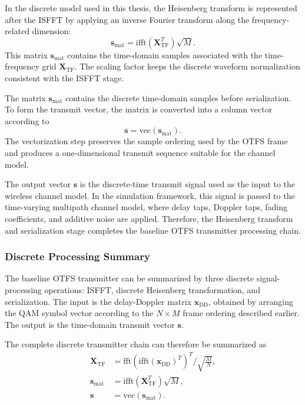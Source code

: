 In the discrete model used in this thesis, the Heisenberg transform is represented after the ISFFT by applying an inverse Fourier transform along the frequency-related dimension:
\begin{equation}
    \mathbf{s}_{\mathrm{mat}}
    =
    \mathrm{ifft}
    \left(
    \mathbf{X}_{\mathrm{TF}}^T
    \right)
    \sqrt{M}.
    \label{eq:heisenberg_matlab}
\end{equation}
This matrix \(\mathbf{s}_{\mathrm{mat}}\) contains the time-domain samples associated with the time-frequency grid \(\mathbf{X}_{\mathrm{TF}}\). The scaling factor keeps the discrete waveform normalization consistent with the ISFFT stage.

The matrix \(\mathbf{s}_{\mathrm{mat}}\) contains the discrete time-domain samples before serialization. To form the transmit vector, the matrix is converted into a column vector according to
\begin{equation}
    \mathbf{s}
    =
    \mathrm{vec}
    \left(
    \mathbf{s}_{\mathrm{mat}}
    \right).
    \label{eq:tx_vector}
\end{equation}
The vectorization step preserves the sample ordering used by the OTFS frame and produces a one-dimensional transmit sequence suitable for the channel model.

The output vector \(\mathbf{s}\) is the discrete-time transmit signal used as the input to the wireless channel model. In the simulation framework, this signal is passed to the time-varying multipath channel model, where delay taps, Doppler taps, fading coefficients, and additive noise are applied. Therefore, the Heisenberg transform and serialization stage completes the baseline OTFS transmitter processing chain.

\subsubsection{Discrete Processing Summary}

The baseline OTFS transmitter can be summarized by three discrete signal-processing operations: ISFFT, discrete Heisenberg transformation, and serialization. The input is the delay-Doppler matrix \(\mathbf{x}_{\mathrm{DD}}\), obtained by arranging the QAM symbol vector according to the \(N \times M\) frame ordering described earlier. The output is the time-domain transmit vector \(\mathbf{s}\).

The complete discrete transmitter chain can therefore be summarized as
\begin{equation}
\begin{aligned}
    \mathbf{X}_{\mathrm{TF}}
    &=
    \mathrm{fft}
    \left(
    \mathrm{ifft}
    \left(
    \mathbf{x}_{\mathrm{DD}}
    \right)^T
    \right)^T
    \bigg/
    \sqrt{\frac{M}{N}},
    \\
    \mathbf{s}_{\mathrm{mat}}
    &=
    \mathrm{ifft}
    \left(
    \mathbf{X}_{\mathrm{TF}}^T
    \right)
    \sqrt{M},
    \\
    \mathbf{s}
    &=
    \mathrm{vec}
    \left(
    \mathbf{s}_{\mathrm{mat}}
    \right).
\end{aligned}
\end{equation}

